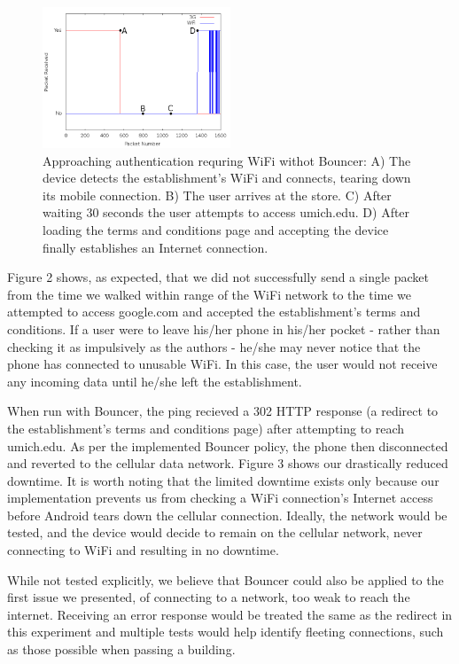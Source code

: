 \begin{figure}
	\includegraphics[width=0.5\textwidth]{paneraNoPolicy}
	\caption{Approaching authentication requring WiFi withot Bouncer: A) The device detects the establishment's WiFi and connects, tearing down its mobile connection. B) The user arrives at the store. C) After waiting 30 seconds the user attempts to access umich.edu. D) After loading the terms and conditions page and accepting the device finally establishes an Internet connection.}
\end{figure}

Figure 2 shows, as expected, that we did not successfully send a single packet from the time we walked within range of the WiFi network to the time we attempted to access google.com and accepted the establishment's terms and conditions. If a user were to leave his/her phone in his/her pocket - rather than checking it as impulsively as the authors - he/she may never notice that the phone has connected to unusable WiFi. In this case, the user would not receive any incoming data until he/she left the establishment.

When run with Bouncer, the ping recieved a 302 HTTP response (a redirect to the establishment's terms and conditions page) after attempting to reach umich.edu. As per the implemented Bouncer policy, the phone then disconnected and reverted to the cellular data network. Figure 3 shows our drastically reduced downtime. It is worth noting that the limited downtime exists only because our implementation prevents us from checking a WiFi connection's Internet access before Android tears down the cellular connection. Ideally, the network would be tested, and the device would decide to remain on the cellular network, never connecting to WiFi and resulting in no downtime.

While not tested explicitly, we believe that Bouncer could also be applied to the first issue we presented, of connecting to a network, too weak to reach the internet. Receiving an error response would be treated the same as the redirect in this experiment and multiple tests would help identify fleeting connections, such as those possible when passing a building.

